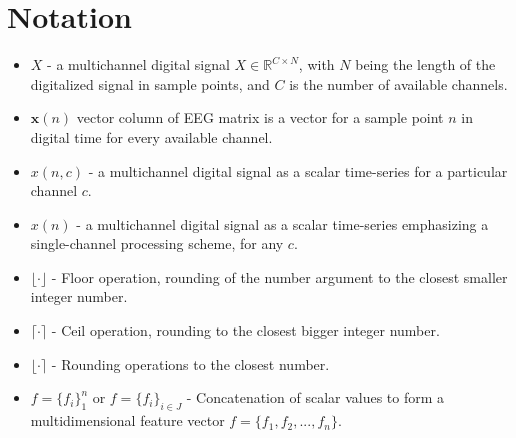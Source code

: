 \chapter*{Notation}

\begin{itemize}
\item $X$ -  a multichannel digital signal $X \in \mathbb{R}^{C \times N}$, with $N$ being the length of the digitalized signal in sample points, and $C$ is the number of available channels.  
\item $\mathbf{x}(n)$ vector column of EEG matrix is a vector for a sample point $n$ in digital time for every available channel.  
\item $x(n,c)$ - a multichannel digital signal as a scalar time-series for a particular channel $c$.  
\item $x(n)$ - a multichannel digital signal as a scalar time-series emphasizing a single-channel processing scheme, for any $c$.
\item $\lfloor \cdot \rfloor$ - Floor operation, rounding of the number argument to the closest smaller integer number.
\item $\lceil \cdot \rceil$ - Ceil operation, rounding to the closest bigger integer number.
\item $\lfloor \cdot \rceil$ - Rounding operations to the closest number.
\item $f=\{f_i\}_{1}^{n} $ or $f=\{f_i\}_{i \in J}^{} $ - Concatenation of scalar values to form a multidimensional feature vector $f=\{f_1,f_2,...,f_n\}$.
\end{itemize}


%
%
